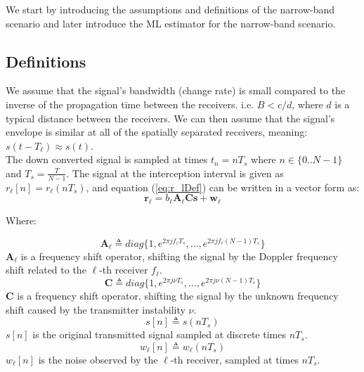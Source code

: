 We start by introducing the assumptions and definitions of the narrow-band scenario and later introduce the ML estimator for the narrow-band scenario.

\subsection{Definitions}
We assume that the signal's bandwidth (change rate) is small compared to the inverse of the propagation time between the receivers. i.e. $B<c/d$, where $d$ is a typical distance between the receivers. We can then assume that the signal's envelope is similar at all of the spatially separated receivers, meaning: $s(t-T_\ell )\approx s(t)$.\\
 
The down converted signal is sampled at times $t_n=nT_s$ where $n\in\{0..N-1\}$ and $T_s =\frac{T}{N-1}$.
The signal at the interception interval is given as $r_\ell [n]=r_\ell (nT_s)$, and equation (\ref{eq:r_lDef}) can be written in a vector form as:
\begin{equation}
\mathbf{r_\ell}=b_\ell \mathbf{A_\ell}\mathbf{C} \mathbf{s} + \mathbf{w_\ell}
\end{equation}

Where:

\begin{equation}
\mathbf{A_\ell} \triangleq diag\{1,e^{2 \pi j f_\ell  T_s},\dots,e^{2 \pi j f_\ell (N-1) T_s} \}                                                         
\end{equation}
$\mathbf{A_\ell}$ is a frequency shift operator, shifting the signal by the Doppler frequency shift related to the $\ell$-th receiver $f_\ell$.
\begin{equation}
\mathbf{C} \triangleq diag \{1  ,e^{2 \pi j \nu T_s},\dots,e^{2 \pi j \nu (N-1) T_s }\}                                                         
\end{equation}
$\mathbf{C}$ is a frequency shift operator, shifting the signal by the unknown frequency shift caused by the transmitter instability $\nu$.
\begin{equation}
s[n] \triangleq s(nT_s)                                                                                                          
\end{equation}
$s[n]$ is the original transmitted signal sampled at discrete times $nT_s$.
\begin{equation}
w_\ell [n] \triangleq w_\ell (nT_s)                                                                                                       
\end{equation}
$w_\ell [n]$ is the noise observed by the $\ell$-th receiver, sampled at times $nT_s$.\\

